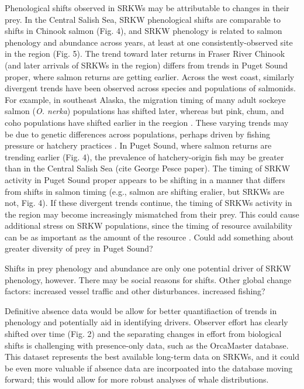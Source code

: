 \documentclass{article}
\begin{document}
\par Phenological shifts observed in SRKWs may be attributable to changes in their prey. In the Central Salish Sea, SRKW phenological shifts are comparable to shifts in Chinook salmon (Fig. 4), and SRKW phenology is related to salmon phenology and abundance across years, at least at one consistently-observed site in the region (Fig. 5). The trend toward later returns in Fraser River Chinook (and later arrivals of SRKWs in the region) differs from trends in Puget Sound proper, where salmon returns are getting earlier. Across the west coast, similarly divergent trends have been observed across species and populations of salmonids. For example, in southeast Alaska, the migration timing of many adult sockeye salmon (\emph{O. nerka}) populations has shifted later, whereas but pink, chum, and coho populations have shifted earlier in the reegion \citep{kovach2015}. These varying trends may be due to genetic differences across populations, perhaps driven by fishing pressure \citep{tillotson2018,morita2018} or hatchery practices \citep{tillotson2019}. In Puget Sound, where salmon returns are trending earlier (Fig. 4), the prevalence of hatchery-origin fish may be greater than in the Central Salish Sea (cite George Pesce paper). The timing of SRKW activity in Puget Sound proper appears to be shifting in a manner that differs from shifts in salmon timing (e.g., salmon are shifting eralier, but SRKWs are not, Fig. 4). If these divergent trends continue, the timing of SRKWs activity in the region may become increasingly mismatched from their prey. This could cause additional stress on SRKW populations, since the timing of resource availability can be as important as the amount of the resource \citep[Brianna's work,][]{hipfner2008}. Could add something about greater diversity of prey in Puget Sound\citep{ford2016,hanson2010}?
\par Shifts in prey phenology and abundance are only one potential driver of SRKW phenology, however. There may be social reasons for shifts. Other global change factors: increased vessel traffic and other disturbances. increased fishing?
\par Definitive absence data would be allow for better quantifiaction of trends in phenology and potentially aid in identifying drivers. Observer effort has clearly shifted over time (Fig. 2) and the separating changes in effort from biological shifts is challenging with presence-only data, such as the OrcaMaster database. This dataset represents the best available long-term data on SRKWs, and it could be even more valuable if absence data are incorpoated into the database moving forward; this would allow for more robust analyses of whale distributions. 
\par 
\end{document}
